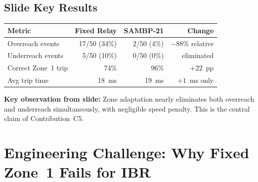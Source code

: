\documentclass[12pt,a4paper]{article}
\begin{document}
\subsection{Slide Key Results}

\begin{center}
\begin{tabular}{@{}lrrr@{}}
\toprule
\textbf{Metric} & \textbf{Fixed Relay} & \textbf{SAMBP-21} & \textbf{Change} \\
\midrule
Overreach events   & 17/50 (34\%) & 2/50  (4\%) & $-88\%$ relative \\
Underreach events  & 5/50  (10\%) & 0/50  (0\%) & eliminated \\
Correct Zone~1 trip & 74\%        & 96\%        & $+22$~pp \\
Avg trip time       & 18~ms       & 19~ms       & $+1$~ms only \\
\bottomrule
\end{tabular}
\end{center}

\textbf{Key observation from slide:} Zone adaptation nearly eliminates both overreach and underreach simultaneously, with negligible speed penalty. This is the central claim of Contribution~C5.

\section{Engineering Challenge: Why Fixed Zone~1 Fails for IBR}
\end{document}
